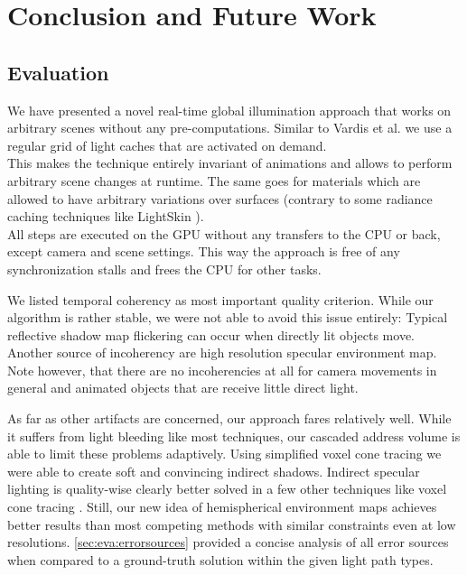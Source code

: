 \documentclass[thesis.tex]{subfiles}
\begin{document}
\chapter{Conclusion and Future Work}\label{chap:concl}


\section{Evaluation}
We have presented a novel real-time global illumination approach that works on arbitrary scenes without any pre-computations.
Similar to Vardis et al. \cite{bib:radiancecachechromaticcompression} we use a regular grid of light caches that are activated on demand.
\\
This makes the technique entirely invariant of animations and allows to perform arbitrary scene changes at runtime.
The same goes for materials which are allowed to have arbitrary variations over surfaces (contrary to some radiance caching techniques like LightSkin \cite{bib:LightskinPaper}).
\\
All steps are executed on the GPU without any transfers to the CPU or back, except camera and scene settings.
This way the approach is free of any synchronization stalls and frees the CPU for other tasks.

We listed temporal coherency as most important quality criterion.
While our algorithm is rather stable, we were not able to avoid this issue entirely:
Typical reflective shadow map flickering can occur when directly lit objects move.
Another source of incoherency are high resolution specular environment map.
Note however, that there are no incoherencies at all for camera movements in general and animated objects that are receive little direct light.

As far as other artifacts are concerned, our approach fares relatively well.
While it suffers from light bleeding like most techniques, our cascaded address volume is able to limit these problems adaptively.
Using simplified voxel cone tracing we were able to create soft and convincing indirect shadows.
Indirect specular lighting is quality-wise clearly better solved in a few other techniques like voxel cone tracing \cite{bib:voxelconetracing}.
Still, our new idea of hemispherical environment maps achieves better results than most competing methods with similar constraints even at low resolutions.
\autoref{sec:eva:errorsources} provided a concise analysis of all error sources when compared to a ground-truth solution within the given light path types.
\end{document}
